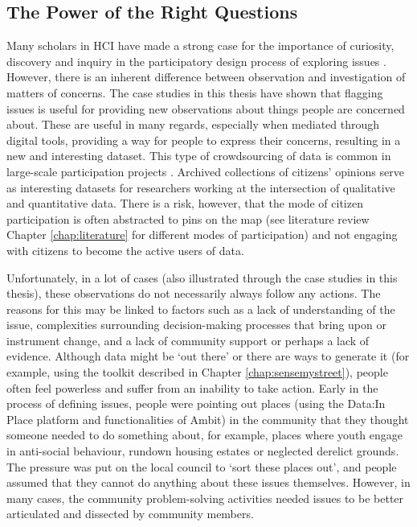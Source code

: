 \subsection{The Power of the Right Questions}
Many scholars in HCI have made a strong case for the importance of curiosity, discovery and inquiry in the participatory design process of exploring issues \citep{marres_issues_2007,moor_beyond_2007,disalvo_neighborhood_2008,dantec_infrastructuring_2013,balestrini_beyond_2014,balaam_feedfinder:_2015}. However, there is an inherent difference between observation and investigation of matters of concerns. The case studies in this thesis have shown that flagging issues is useful for providing new observations about things people are concerned about. These are useful in many regards, especially when mediated through digital tools, providing a way for people to express their concerns, resulting in a new and interesting dataset. This type of crowdsourcing of data is common in large-scale participation projects \citep{dantec_data-based_2014,liu_crisis_2014,thompson_crowd-sourced_2016}. Archived collections of citizens' opinions serve as interesting datasets for researchers working at the intersection of qualitative and quantitative data. There is a risk, however, that the mode of citizen participation is often abstracted to pins on the map (see literature review Chapter \ref{chap:literature} for different modes of participation) and not engaging with citizens to become the active users of data.

Unfortunately, in a lot of cases (also illustrated through the case studies in this thesis), these observations do not necessarily always follow any actions. The reasons for this may be linked to factors such as a lack of understanding of the issue, complexities surrounding decision-making processes that bring upon or instrument change, and a lack of community support or perhaps a lack of evidence. Although data might be `out there' or there are ways to generate it (for example, using the toolkit described in Chapter \ref{chap:sensemystreet}), people often feel powerless and suffer from an inability to take action. Early in the process of defining issues, people were pointing out places (using the Data:In Place platform and functionalities of Ambit) in the community that they thought someone needed to do something about, for example, places where youth engage in anti-social behaviour, rundown housing estates or neglected derelict grounds. The pressure was put on the local council to `sort these places out', and people assumed that they cannot do anything about these issues themselves. However, in many cases, the community problem-solving activities needed issues to be better articulated and dissected by community members.

